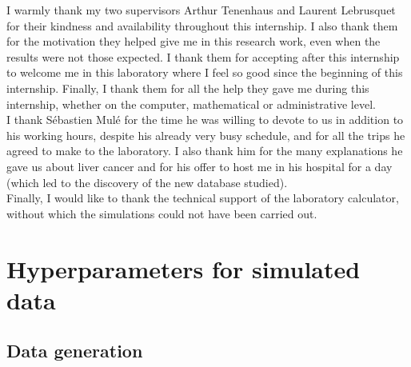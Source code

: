 \documentclass[preprint,12pt]{elsarticle}
\begin{document}
\vspace{2em}
I warmly thank my two supervisors Arthur Tenenhaus and Laurent Lebrusquet for their kindness and availability throughout this internship. I also thank them for the motivation they helped give me in this research work, even when the results were not those expected. I thank them for accepting after this internship to welcome me in this laboratory where I feel so good since the beginning of this internship. Finally, I thank them for all the help they gave me during this internship, whether on the computer, mathematical or administrative level.\\[1em]
\indent I thank Sébastien Mulé for the time he was willing to devote to us in addition to his working hours, despite his already very busy schedule, and for all the trips he agreed to make to the laboratory. I also thank him for the many explanations he gave us about liver cancer and for his offer to host me in his hospital for a day (which led to the discovery of the new database studied).\\[1em]
\indent Finally, I would like to thank the technical support of the laboratory calculator, without which the simulations could not have been carried out.




\newpage
  
 



\newpage

\appendix

\section{Hyperparameters for simulated data}
\label{annexe:hyperparam}
\subsection{Data generation}
\end{document}
